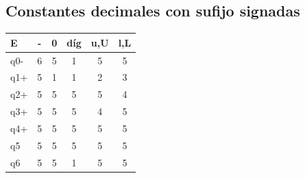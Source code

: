 \documentclass[a4paper, 12pt]{article}
\begin{document}
\subsection*{Constantes decimales con sufijo signadas}
\bigbreak
\begin{center}
    \begin{tabular}{||l c c c c c||}
        \hline
        E & - & 0 & díg & u,U & l,L \\
        \hline\hline
        q0- &6&5&1&5&5 \\ \hline
        q1+ &5&1&1&2&3 \\ \hline
        q2+ &5&5&5&5&4 \\ \hline
        q3+ &5&5&5&4&5 \\ \hline
        q4+ &5&5&5&5&5 \\ \hline
        q5  &5&5&5&5&5 \\ \hline
        q6  &5&5&1&5&5 \\ \hline
    \end{tabular}
\end{center}
\end{document}
